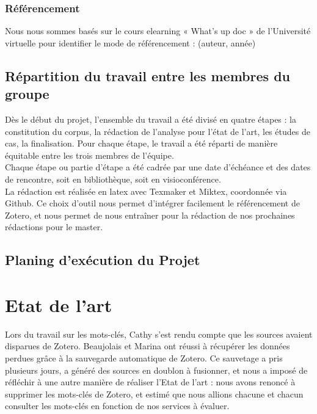 \documentclass[french,a4paper,12pt]{article}
\begin{document}
\subsubsection{Référencement }
Nous nous sommes basés sur le cours elearning « What’s up doc » de l’Université virtuelle pour identifier le mode de référencement : (auteur, année)

\subsection{Répartition du travail entre les membres du groupe}
\quad Dès le début du projet, l’ensemble du travail a été divisé en quatre étapes : la constitution du corpus, la rédaction de l'analyse pour l’état de l’art, les études de cas, la finalisation. Pour chaque étape, le travail a été réparti de manière équitable entre les trois membres de l’équipe. \\

Chaque étape ou partie d’étape a été cadrée par une date d’échéance et des dates de rencontre, soit en bibliothèque, soit en visioconférence. \\

La rédaction est réalisée en latex avec Texmaker et Miktex, coordonnée via Github. Ce choix d’outil nous permet d’intégrer facilement le référencement de Zotero, et nous permet de nous entraîner pour la rédaction de nos prochaines rédactions pour le master. \\

\subsection{Planing d'exécution du Projet}





\newpage
\section{Etat de l'art}

\quad Lors du travail sur les mots-clés, Cathy s’est rendu compte que les sources avaient disparues de Zotero. Beaujolais et Marina ont réussi à récupérer les données perdues grâce à la sauvegarde automatique de Zotero. Ce sauvetage a pris plusieurs jours, a généré des sources en doublon à fusionner, et nous a imposé de réfléchir à une autre manière de réaliser l’Etat de l'art : nous avons renoncé à supprimer les mots-clés de Zotero, et estimé que nous allions chacune et chacun consulter les mots-clés en fonction de nos services à évaluer. 
\end{document}
